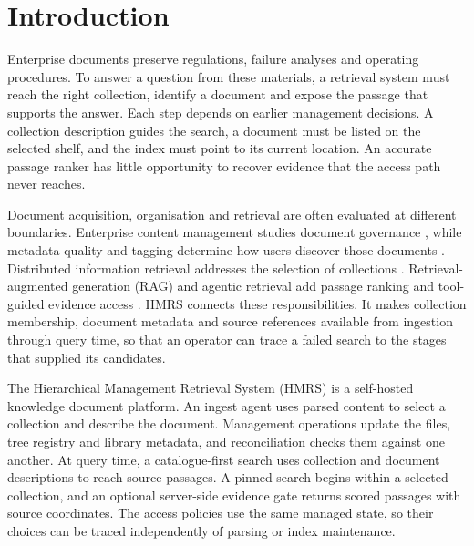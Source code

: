 \section{Introduction}
\label{sec:intro}

Enterprise documents preserve regulations, failure analyses and operating
procedures. To answer a question from these materials, a retrieval system
must reach the right collection, identify a document and expose the passage
that supports the answer. Each step depends on earlier management decisions.
A collection description guides the search, a document must be listed on
the selected shelf, and the index must point to its current location.
An accurate passage ranker has little opportunity to recover evidence that
the access path never reaches.

Document acquisition, organisation and retrieval are often evaluated at
different boundaries. Enterprise content management studies document
governance \cite{paivarinta-ecm-2005,tyrvaainen-ecm-2006}, while metadata
quality and tagging determine how users discover those documents
\cite{park-metadata-quality-2009,golder-tagging-2006}. Distributed
information retrieval addresses the selection of collections
\cite{callan1995searching,si2003redde}. Retrieval-augmented generation
(RAG) and agentic retrieval add passage ranking and tool-guided evidence
access \cite{rag-lewis,dpr,modular-rag,mcp}.
HMRS connects these responsibilities. It makes collection membership,
document metadata and source references available from ingestion through
query time, so that an operator can trace a failed search to the stages
that supplied its candidates.

The Hierarchical Management Retrieval System (HMRS) is a self-hosted
knowledge document platform. An ingest agent uses parsed content to select
a collection and describe the document. Management operations update the
files, tree registry and library metadata, and reconciliation checks them
against one another. At query time, a catalogue-first search uses collection
and document descriptions to reach source passages. A pinned search begins
within a selected collection, and an optional server-side evidence gate
returns scored passages with source coordinates. The access policies use the
same managed state, so their choices can be traced independently of parsing
or index maintenance.

